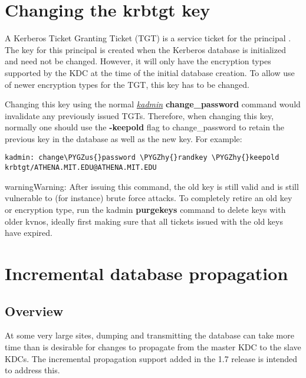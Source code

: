 \documentclass[letterpaper,10pt,english]{sphinxmanual}
\def\PYGZus{\char`\_}
\def\PYGZhy{\char`\-}
\begin{document}
\section{Changing the krbtgt key}
\label{admin/database:changing-krbtgt-key}\label{admin/database:changing-the-krbtgt-key}
A Kerberos Ticket Granting Ticket (TGT) is a service ticket for the
principal .  The key for this principal is created
when the Kerberos database is initialized and need not be changed.
However, it will only have the encryption types supported by the KDC
at the time of the initial database creation.  To allow use of newer
encryption types for the TGT, this key has to be changed.

Changing this key using the normal {\hyperref[admin/admin_commands/kadmin_local:kadmin-1]{\emph{kadmin}}}
\textbf{change\_password} command would invalidate any previously issued
TGTs.  Therefore, when changing this key, normally one should use the
\textbf{-keepold} flag to change\_password to retain the previous key in the
database as well as the new key.  For example:

\begin{Verbatim}[commandchars=\\\{\}]
kadmin: change\PYGZus{}password \PYGZhy{}randkey \PYGZhy{}keepold krbtgt/ATHENA.MIT.EDU@ATHENA.MIT.EDU
\end{Verbatim}

\begin{notice}{warning}{Warning:}
After issuing this command, the old key is still valid
and is still vulnerable to (for instance) brute force
attacks.  To completely retire an old key or encryption
type, run the kadmin \textbf{purgekeys} command to delete keys
with older kvnos, ideally first making sure that all
tickets issued with the old keys have expired.
\end{notice}


\section{Incremental database propagation}
\label{admin/database:incremental-database-propagation}\label{admin/database:incr-db-prop}

\subsection{Overview}
\label{admin/database:overview}
At some very large sites, dumping and transmitting the database can
take more time than is desirable for changes to propagate from the
master KDC to the slave KDCs.  The incremental propagation support
added in the 1.7 release is intended to address this.
\end{document}
